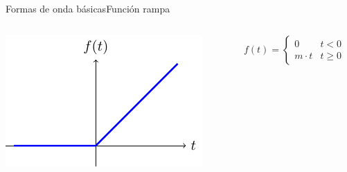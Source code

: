 \documentclass[aspectratio=169, xcolor={usenames,svgnames,dvipsnames}]{beamer}
\begin{document}
\begin{frame}{Formas de onda básicas}{Función rampa}
\begin{columns}
\begin{column}{0.5\columnwidth}
\begin{center}
\includegraphics[width=.9\linewidth]{../figs/rampa.pdf}
\end{center}
\end{column}

\begin{column}{0.5\columnwidth}
\[
  f(t) = %
  \begin{cases}
    0 & t < 0\\
    m \cdot t  & t \geq 0
  \end{cases}
  \]
\end{column}
\end{columns}
\end{frame}
\end{document}
